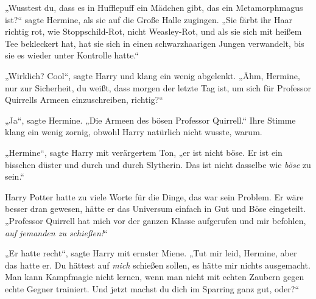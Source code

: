 „Wusstest du, dass es in Hufflepuff ein Mädchen gibt, das ein Metamorphmagus ist?“ sagte Hermine, als sie auf die Große Halle zugingen.
„Sie färbt ihr Haar richtig rot, wie Stoppschild-Rot, nicht Weasley-Rot, und als sie sich mit heißem Tee bekleckert hat, hat sie sich in einen schwarzhaarigen Jungen verwandelt, bis sie es wieder unter Kontrolle hatte.“

„Wirklich? Cool“, sagte Harry und klang ein wenig abgelenkt. „Ähm, Hermine, nur zur Sicherheit, du weißt, dass morgen der letzte Tag ist, um sich für Professor Quirrells Armeen einzuschreiben, richtig?“

„Ja“, sagte Hermine.
„Die Armeen des bösen Professor Quirrell.“ Ihre Stimme klang ein wenig zornig, obwohl Harry natürlich nicht wusste, warum.

„Hermine“, sagte Harry mit verärgertem Ton, „er ist nicht böse. Er ist ein bisschen düster und durch und durch Slytherin. Das ist nicht dasselbe wie \emph{böse} zu sein.“

Harry Potter hatte zu viele Worte für die Dinge, das war sein Problem. Er wäre besser dran gewesen, hätte er das Universum einfach in Gut und Böse eingeteilt.
„Professor Quirrell hat mich vor der ganzen Klasse aufgerufen und mir befohlen, \emph{auf jemanden zu schießen!}“

„Er hatte recht“, sagte Harry mit ernster Miene.
„Tut mir leid, Hermine, aber das hatte er. Du hättest auf \emph{mich} schießen sollen, es hätte mir nichts ausgemacht. Man kann Kampfmagie nicht lernen, wenn man nicht mit echten Zaubern gegen echte Gegner trainiert. Und jetzt machst du dich im Sparring ganz gut, oder?“

